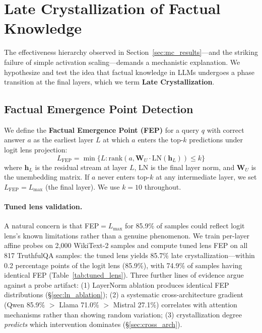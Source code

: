 \documentclass{article}
\begin{document}
\section{Late Crystallization of Factual Knowledge}
\label{sec:crystallization}

The effectiveness hierarchy observed in Section~\ref{sec:mc_results}---and the striking failure of simple activation scaling---demands a mechanistic explanation. We hypothesize and test the idea that factual knowledge in LLMs undergoes a phase transition at the final layers, which we term \textbf{Late Crystallization}.

\subsection{Factual Emergence Point Detection}
\label{sec:fep}

We define the \textbf{Factual Emergence Point (FEP)} for a query $q$ with correct answer $a$ as the earliest layer $L$ at which $a$ enters the top-$k$ predictions under logit lens projection:
\begin{equation}
    L_{\text{FEP}} = \min\{L : \text{rank}(a, \mathbf{W}_U \cdot \text{LN}(\mathbf{h}_L)) \leq k\}
\end{equation}
where $\mathbf{h}_L$ is the residual stream at layer $L$, LN is the final layer norm, and $\mathbf{W}_U$ is the unembedding matrix. If $a$ never enters top-$k$ at any intermediate layer, we set $L_{\text{FEP}} = L_{\max}$ (the final layer). We use $k=10$ throughout.

\paragraph{Tuned lens validation.} A natural concern is that FEP${}=L_{\max}$ for 85.9\% of samples could reflect logit lens's known limitations rather than a genuine phenomenon. We train per-layer affine probes on 2{,}000 WikiText-2 samples and compute tuned lens FEP on all 817 TruthfulQA samples: the tuned lens yields 85.7\% late crystallization---within 0.2 percentage points of the logit lens (85.9\%), with 74.9\% of samples having identical FEP (Table~\ref{tab:tuned_lens}). Three further lines of evidence argue against a probe artifact: (1) LayerNorm ablation produces identical FEP distributions (\S\ref{sec:ln_ablation}); (2) a systematic cross-architecture gradient (Qwen 85.9\% $>$ Llama 71.0\% $>$ Mistral 27.1\%) correlates with attention mechanisms rather than showing random variation; (3) crystallization degree \emph{predicts} which intervention dominates (\S\ref{sec:cross_arch}).
\end{document}
